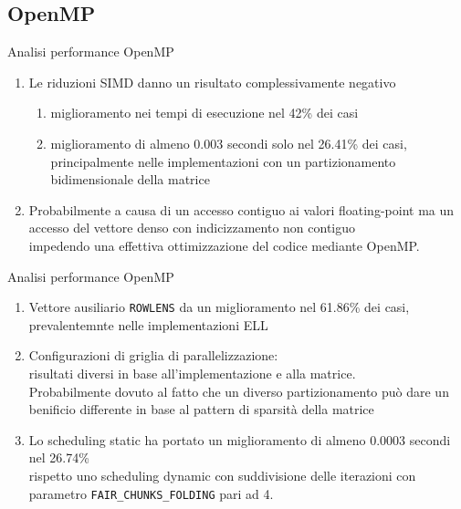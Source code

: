 \documentclass[aspectratio=1610]{beamer}
\newcommand{\vvv}[1]{{\small\texttt{#1}}}
\begin{document}
\subsection{OpenMP}
\begin{frame}{Analisi performance OpenMP}
	\begin{enumerate}
		\item	Le riduzioni SIMD danno un risultato complessivamente negativo
		\begin{enumerate}
			\item	miglioramento nei tempi di esecuzione nel 42\% dei casi
			\item	miglioramento di almeno 0.003 secondi solo nel 26.41\% dei casi, \\
					principalmente nelle implementazioni con un partizionamento bidimensionale della matrice
		\end{enumerate}
		\pause
		\item 	Probabilmente a causa di un accesso contiguo ai valori floating-point ma un
				accesso del vettore denso con indicizzamento non contiguo \\
				impedendo una effettiva ottimizzazione del codice mediante OpenMP.
	\end{enumerate}
\end{frame}
\begin{frame}{Analisi performance OpenMP}
	\begin{enumerate}
		\item	Vettore ausiliario \vvv{ROWLENS} da un miglioramento nel 61.86\% dei casi,\\
				prevalentemnte nelle implementazioni ELL
		\pause
		\item	Configurazioni di griglia di parallelizzazione:\\
				risultati diversi in base all'implementazione  e alla matrice.\\
				\pause
				Probabilmente dovuto al fatto che un diverso partizionamento può dare 
				un benificio differente in base al pattern di sparsità della matrice
		\pause
		\item 	Lo scheduling static ha portato un miglioramento di almeno 0.0003 secondi nel 26.74\%\\
				rispetto uno scheduling dynamic con suddivisione delle iterazioni 
				con parametro \vvv{FAIR\_CHUNKS\_FOLDING} pari ad 4.\\
	\end{enumerate}
\end{frame}
\end{document}
